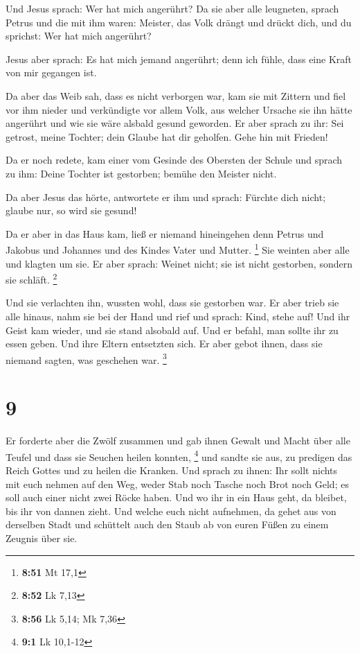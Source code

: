  Und Jesus sprach: Wer hat mich angerührt? Da sie aber
alle leugneten, sprach Petrus und die mit ihm waren: Meister, das Volk
drängt und drückt dich, und du sprichst: Wer hat mich angerührt?

 Jesus aber sprach: Es hat mich jemand angerührt; denn
ich fühle, dass eine Kraft von mir gegangen ist.

 Da aber das Weib sah, dass es nicht verborgen war, kam
sie mit Zittern und fiel vor ihm nieder und verkündigte vor allem Volk,
aus welcher Ursache sie ihn hätte angerührt und wie sie wäre alsbald
gesund geworden.  Er aber sprach zu ihr: Sei getrost,
meine Tochter; dein Glaube hat dir geholfen. Gehe hin mit Frieden!

 Da er noch redete, kam einer vom Gesinde des Obersten
der Schule und sprach zu ihm: Deine Tochter ist gestorben; bemühe den
Meister nicht.

 Da aber Jesus das hörte, antwortete er ihm und sprach:
Fürchte dich nicht; glaube nur, so wird sie gesund!

 Da er aber in das Haus kam, ließ er niemand hineingehen
denn Petrus und Jakobus und Johannes und des Kindes Vater und Mutter.
\footnote{\textbf{8:51} Mt 17,1}  Sie weinten aber alle
und klagten um sie. Er aber sprach: Weinet nicht; sie ist nicht
gestorben, sondern sie schläft. \footnote{\textbf{8:52} Lk 7,13}

 Und sie verlachten ihn, wussten wohl, dass sie gestorben
war.  Er aber trieb sie alle hinaus, nahm sie bei der
Hand und rief und sprach: Kind, stehe auf!  Und ihr Geist
kam wieder, und sie stand alsobald auf. Und er befahl, man sollte ihr zu
essen geben.  Und ihre Eltern entsetzten sich. Er aber
gebot ihnen, dass sie niemand sagten, was geschehen war. \footnote{\textbf{8:56}
  Lk 5,14; Mk 7,36}

\hypertarget{section-3}{%
\section{9}\label{section-3}}

 Er forderte aber die Zwölf zusammen und gab ihnen Gewalt
und Macht über alle Teufel und dass sie Seuchen heilen konnten,
\footnote{\textbf{9:1} Lk 10,1-12}  und sandte sie aus, zu
predigen das Reich Gottes und zu heilen die Kranken.  Und
sprach zu ihnen: Ihr sollt nichts mit euch nehmen auf den Weg, weder
Stab noch Tasche noch Brot noch Geld; es soll auch einer nicht zwei
Röcke haben.  Und wo ihr in ein Haus geht, da bleibet, bis
ihr von dannen zieht.  Und welche euch nicht aufnehmen, da
gehet aus von derselben Stadt und schüttelt auch den Staub ab von euren
Füßen zu einem Zeugnis über sie.

